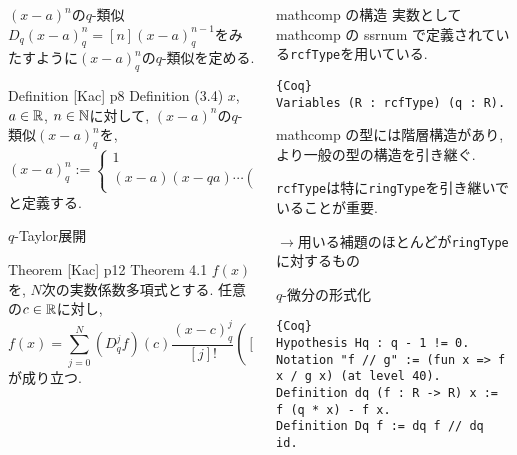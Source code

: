 \documentclass[unicode,mathserif]{beamer}
\begin{document}
\begin{frame}[fragile]
\begin{columns}[T]
\begin{column}{0.33\columnwidth}
		\begin{block}{$(x - a)^n$の$q$-類似}
			$D_q(x-a)^n_q = [n](x-a)^{n-1}_q$をみたすように$(x - a)^n_q$の$q$-類似を定める. 
			\begin{itembox}{Definition [Kac] p8 Definition (3.4)}
			$x$, $a \in \mathbb R$, $n \in \mathbb N$に対して, $(x - a)^n$の$q$-類似$(x - a)^n_q$を, 
			\[
				(x - a)^n_q := \begin{cases}
					1 & \text{if}\ n = 0 \\
					(x - a) (x - qa) \cdots (x - q^{n - 1} a) & \text{if}\ n \ge 1
				\end{cases}
			\]
			と定義する.
			\end{itembox}
		\end{block}
		
		\begin{block}{$q$-Taylor展開}
			\begin{itembox}{Theorem [Kac] p12 Theorem 4.1}
				$f(x)$を, $N$次の実数係数多項式とする. 任意の$c\in\mathbb R$に対し, 
				\[
					f(x) = \sum_{j=0}^N (D_q^jf)(c)\frac{(x-c)^j_q}{[j]!}
						\left( [n]! := \begin{cases}
													1 & (n=0)\\
													[n]\times[n-1]\times\cdots\times[1] & (n\ge1)
												\end{cases}
						\right)
				\]
				が成り立つ.
			\end{itembox}
		\end{block}
	\end{column}

	\begin{column}{0.33\columnwidth}
		\begin{block}{mathcomp の構造}
			実数として mathcomp の ssrnum で定義されている{\tt rcfType}を用いている. 
			\begin{lstlisting}{Coq}
Variables (R : rcfType) (q : R). \end{lstlisting}			
			mathcomp の型には階層構造があり, より一般の型の構造を引き継ぐ. 
			
			{\tt rcfType}は特に{\tt ringType}を引き継いでいることが重要. 
			
			$\to$用いる補題のほとんどが{\tt ringType}に対するもの
		\end{block}
		
		\begin{block}{$q$-微分の形式化}
			\begin{lstlisting}{Coq}
Hypothesis Hq : q - 1 != 0.
Notation "f // g" := (fun x => f x / g x) (at level 40).
Definition dq (f : R -> R) x := f (q * x) - f x.
Definition Dq f := dq f // dq id. \end{lstlisting}
		\end{block}
		

\end{column}
\end{columns}
\end{frame}
\end{document}
